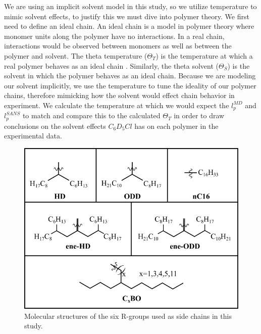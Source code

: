 \par We are using an implicit solvent model in this study, so we utilize temperature to mimic solvent effects, to justify this we must dive into polymer theory. We first need to define an ideal chain. An ideal chain is a model in polymer theory where monomer units along the polymer have no interactions. In a real chain, interactions would be observed between monomers as well as between the polymer and solvent. The theta temperature ($\Theta_{T}$) is the temperature at which a real polymer behaves as an ideal chain \citep{doi, rubin}. Similarly, the theta solvent ($\Theta_{S}$) is the solvent in which the polymer behaves as an ideal chain. Because we are modeling our solvent implicitly, we use the temperature to tune the ideality of our polymer chains, therefore mimicking how the solvent would effect chain behavior in experiment. We calculate the temperature at which we would expect the $l_p^{MD}$ and $l_p^{SANS}$ to match and compare this to the calculated $\Theta_{T}$ in order to draw conclusions on the solvent effects $C_6D_5Cl$ has on each polymer in the experimental data. 
\begin{figure}[h!]
    \centering
    \includegraphics[width=0.8\linewidth]{src/figures/pers_l_figs/r_groups.png}
    \caption{Molecular structures of the six R-groups used as side chains in this study.}
    \label{fig:rgroups}
\end{figure}
\newpage

